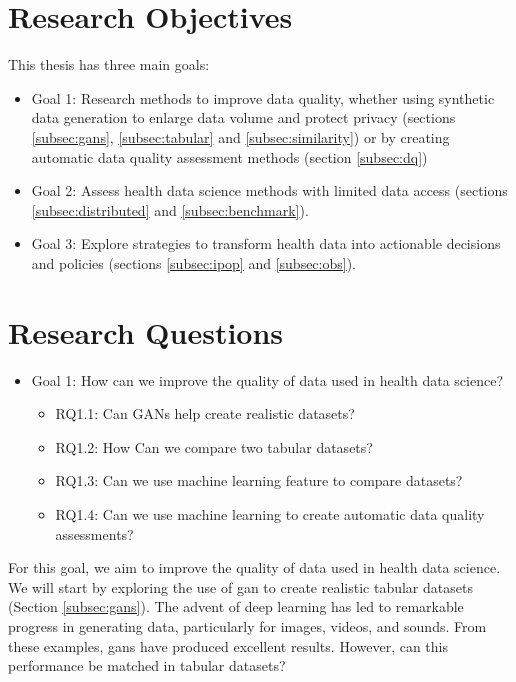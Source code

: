 
\section{Research Objectives}
This thesis has three main goals:


\begin{itemize}
    \item Goal 1: Research methods to improve data quality, whether using synthetic data generation to enlarge data volume and protect privacy (sections \ref{subsec:gans}, \ref{subsec:tabular} and \ref{subsec:similarity}) or by creating automatic data quality assessment methods (section \ref{subsec:dq})

    \item Goal 2: Assess health data science  methods with limited data access (sections \ref{subsec:distributed} and \ref{subsec:benchmark}).

    \item Goal 3: Explore strategies to transform health data into actionable decisions and policies (sections  \ref{subsec:ipop} and \ref{subsec:obs}).
\end{itemize}


\section{Research Questions}

\begin{itemize}
    \item Goal 1: How can we improve the quality of data used in health data science?
    \begin{itemize}
        \item RQ1.1: Can GANs help create realistic datasets?
        \item RQ1.2: How Can we compare two tabular datasets?
        \item RQ1.3: Can we use machine learning feature to compare datasets?
        \item RQ1.4: Can we use machine learning to create automatic data quality assessments?
    \end{itemize}
\end{itemize}

For this goal, we aim to improve the quality of data used in health data science. We will start by exploring the use of \ac{gan} to create realistic tabular datasets (Section \ref{subsec:gans}). The advent of deep learning has led to remarkable progress in generating data, particularly for images, videos, and sounds. From these examples, \acp{gan} have produced excellent results. However, can this performance be matched in tabular datasets?

